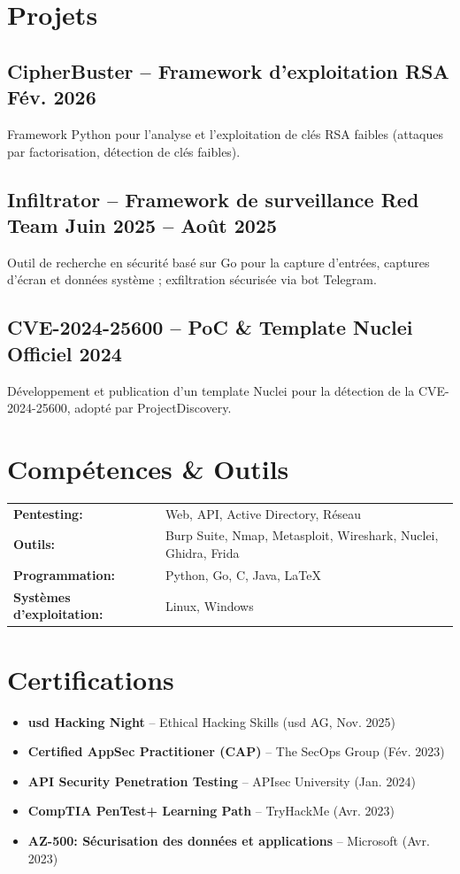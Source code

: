 \documentclass[a4paper,10pt]{article}
\newcommand{\subtext}[1]{#1\par\vspace{-0.2cm}}
\newcommand{\hskills}[1]{\textbf{#1}}
\newenvironment{zitemize}{
    \begin{itemize}[leftmargin=*, labelsep=0.5em, itemsep=0pt, parsep=1pt]
}{\end{itemize}\vspace{-0.2cm}}
\begin{document}
\section{Projets}
\subsection*{CipherBuster -- Framework d'exploitation RSA \hfill Fév. 2026}
\subtext{Framework Python pour l'analyse et l'exploitation de clés RSA faibles (attaques par factorisation, détection de clés faibles).}

\subsection*{Infiltrator -- Framework de surveillance Red Team \hfill Juin 2025 -- Août 2025}
\subtext{Outil de recherche en sécurité basé sur Go pour la capture d'entrées, captures d'écran et données système ; exfiltration sécurisée via bot Telegram.}

\subsection*{CVE-2024-25600 -- PoC \& Template Nuclei Officiel \hfill 2024}
\subtext{Développement et publication d'un template Nuclei pour la détection de la CVE-2024-25600, adopté par ProjectDiscovery.}

\section{Compétences \& Outils}
\begin{tabular}{>{\raggedright\arraybackslash}p{10em} p{38em}}
    \hskills{Pentesting:} & Web, API, Active Directory, Réseau \\
    \hskills{Outils:} & Burp Suite, Nmap, Metasploit, Wireshark, Nuclei, Ghidra, Frida \\
    \hskills{Programmation:} & Python, Go, C, Java, \LaTeX \\
    \hskills{Systèmes d'exploitation:} & Linux, Windows \\
\end{tabular}

\section{Certifications}
\begin{zitemize}
    \item \textbf{usd Hacking Night} -- Ethical Hacking Skills (usd AG, Nov. 2025)
    \item \textbf{Certified AppSec Practitioner (CAP)} -- The SecOps Group (Fév. 2023)
    \item \textbf{API Security Penetration Testing} -- APIsec University (Jan. 2024)
    \item \textbf{CompTIA PenTest+ Learning Path} -- TryHackMe (Avr. 2023)
    \item \textbf{AZ-500: Sécurisation des données et applications} -- Microsoft (Avr. 2023)
\end{zitemize}
\end{document}
